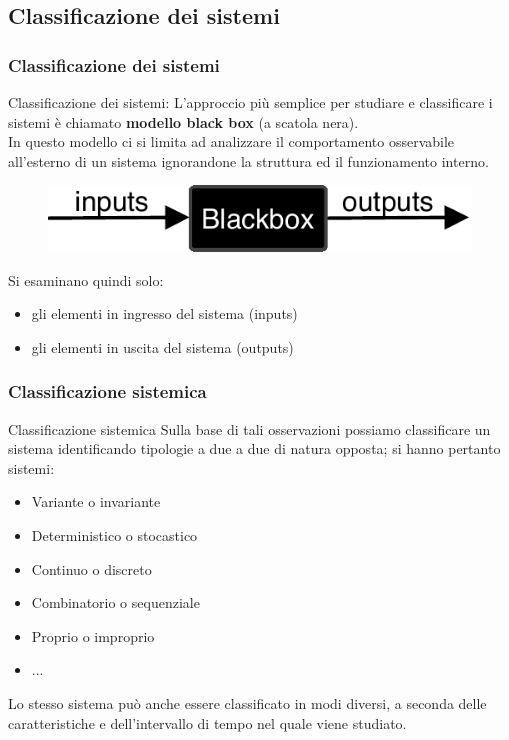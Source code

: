  
\subsection[Classificazione dei sistemi]{Classificazione dei sistemi}

\begin{frame}
	\frametitle{Classificazione dei sistemi}
	\begin{block}{Classificazione dei sistemi:}
		L'approccio più semplice per studiare e classificare i sistemi è chiamato \textbf{modello black box} (a scatola nera).\\
		In questo modello ci si limita ad analizzare il comportamento osservabile all'esterno di un sistema ignorandone la struttura ed il funzionamento interno.
		\begin{figure}[!htbp]
			\centering
			\includegraphics[width=0.8\linewidth]{images/1_i_sistemi/blackbox.pdf}
		\end{figure}
		Si esaminano quindi solo:
		\begin{itemize}
			\item gli elementi in ingresso del sistema (inputs) 
			\item gli elementi in uscita del sistema (outputs)
		\end{itemize}
	\end{block}
\end{frame}



\begin{frame}
	\frametitle{Classificazione sistemica}
	\begin{block}{Classificazione sistemica}
		Sulla base di tali osservazioni possiamo classificare un sistema identificando tipologie a due a due di natura opposta; si hanno pertanto sistemi:
		\begin{itemize}
			\item Variante o invariante
			\item Deterministico o stocastico
			\item Continuo o discreto
			\item Combinatorio o sequenziale			
			\item Proprio o improprio
			\item ...
		\end{itemize}
		
		Lo stesso sistema può anche essere classificato in modi diversi, a seconda delle caratteristiche e dell'intervallo di tempo nel quale viene studiato.\\
	\end{block}
\end{frame}


